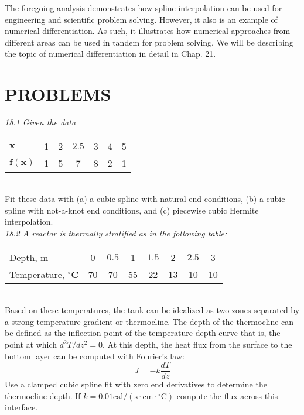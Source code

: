 \documentclass[../main.tex]{subfiles}
\begin{document}
    The foregoing analysis demonstrates how spline interpolation can be used for engineering and scientific problem solving. However, it also is an example of numerical differentiation. As such, it illustrates how numerical approaches from different areas can be used
    in tandem for problem solving. We will be describing the topic of numerical differentiation
    in detail in Chap. 21.

    \vspace{5mm}

    \section{PROBLEMS}
    \begin{multicols}{2}
    \noindent\textit{18.1 Given the data}\vspace{5mm}

    \begin{tabular}{lcccccc}
    \hline $\boldsymbol{x}$ & 1 & 2 & $2.5$ & 3 & 4 & 5 \\
    $\boldsymbol{f}(\boldsymbol{x})$ & 1 & 5 & 7 & 8 & 2 & 1 \\
    \hline
    \end{tabular}\\
    Fit these data with (a) a cubic spline with natural end conditions, (b) a cubic spline with not-a-knot end conditions, and (c) piecewise cubic Hermite interpolation.\\
    \noindent\textit{18.2 A reactor is thermally stratified as in the following table:}\vspace{2mm}\\
    \begin{tabular}{lccccccc}
    \hline Depth, m & 0 & $0.5$ & 1 & $1.5$ & 2 & $2.5$ & 3 \\
    Temperature, ${ }^{\circ} \mathbf{C}$ & 70 & 70 & 55 & 22 & 13 & 10 & 10 \\
    \hline
    \end{tabular}\\
    Based on these temperatures, the tank can be idealized as two zones separated by a strong temperature gradient or thermocline. The depth of the thermocline can be defined as the inflection point of the temperature-depth curve-that is, the point at which $d^{2} T / d z^{2}=0$. At this depth, the heat flux from the surface to the bottom layer can be computed with Fourier's law:
    $$
    J=-k \frac{d T}{d z}
    $$
Use a clamped cubic spline fit with zero end derivatives to determine the thermocline depth. If $k=0.01 \mathrm{cal} /\left(\mathrm{s} \cdot \mathrm{cm} \cdot{ }^{\circ} \mathrm{C}\right)$ compute the flux across this interface.
    

\end{multicols}
\end{document}
